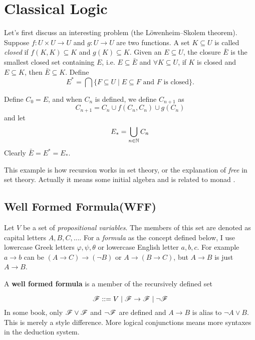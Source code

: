 \chapter{Classical Logic}
\label{classical-logic}
Let's first discuss an interesting problem (the L\"{o}wenheim–Skolem theorem).
Suppose $f:U\times U\to U$ and $g:U\to U$ are two functions. A set
$K\subseteq U$ is called {\it closed} if $f(K,K)\subseteq K$ and 
$g(K)\subseteq K$. Given an $E\subseteq U$, the closure $\bar{E}$ is
the smallest closed set containing $E$, i.e. $E\subseteq \bar{E}$ and
$\forall K\subseteq U$, if $K$ is closed and $E\subseteq K$, then $\bar{E}
\subseteq K$. Define 
$$
    E^\ast = \bigcap\{F\subseteq U\mid E\subseteq F\text{ and $F$ is closed}\}.
$$

Define $C_0=E$, and when $C_n$ is defined, we define $C_{n+1}$ as
$$
    C_{n+1} = C_n\cup f(C_n, C_n)\cup g(C_n)
$$
and let
$$
    E_\ast = \bigcup_{n\in\mathbb{N}}C_n
$$
Clearly $\bar{E}=E^\ast=E_\ast$.

This example is how recursion works in set theory, or the explanation of
{\it free} in set theory. Actually it means some initial algebra 
\cite{homotopy-type-theory} and is related to monad 
\cite{reddy1995monads,jacobs1997tutorial}.

\section{Well Formed Formula(WFF)}

Let $V$ be a set of {\it propositional variables}. The members of this
set are denoted as capital letters $A,B,C,...$. For a {\it formula} as
the concept defined below, I use lowercase Greek letters $\varphi,\psi,\theta$
or lowercase English letter $a,b,c$. For example $a\to b$ can be 
$(A\to C)\to(\neg B)$ or $A\to (B\to C)$, but $A\to B$ is just $A\to B$.

A {\bf well formed formula}
is a member of the recursively defined set

$$
    \mathscr{F} ::= 
        V 
        \mid \mathscr{F} \to \mathscr{F}
        \mid \neg \mathscr{F}
$$
In some book, only $\mathscr{F} \vee \mathscr{F}$ and $\neg \mathscr{F}$ are defined
and $A \to B$ is alias to $\neg A \vee B$. This is merely a style difference.
More logical conjunctions means more syntaxes in the deduction system. 

